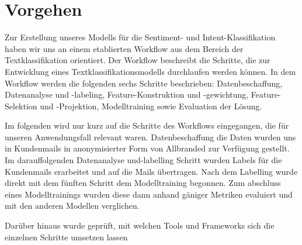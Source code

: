 \chapter{Vorgehen}

Zur Erstellung unseres Modells für die Sentiment- und Intent-Klassifikation haben wir uns an 
einem etablierten Workflow aus dem Bereich der Textklassifikation orientiert. Der Workflow 
beschreibt die Schritte, die zur Entwicklung eines Textklassifikationsmodells durchlaufen werden 
können. In dem Workflow werden die folgenden sechs Schritte beschrieben:  Datenbeschaffung, Datenanalyse 
und -labeling, Feature-Konstruktion und -gewichtung, Feature-Selektion und -Projektion,  Modelltraining 
sowie Evaluation der Lösung. \cite{Mirończuk}

Im folgenden wird nur kurz auf die Schritte des Workflows eingegangen, die für 
unseren Anwendungsfall relevant waren. Datenbeschaffung die Daten wurden uns in Kundenmails in anonymisierter 
Form von Allbranded zur Verfügung gestellt. Im darauffolgenden Datenanalyse und-labelling Schritt wurden Labels 
für die Kundenmails erarbeitet und auf die Mails übertragen. Nach dem Labelling wurde direkt mit dem fünften 
Schritt dem Modelltraining begonnen. Zum abschluss eines Modelltrainings wurden diese dann anhand gäniger
Metriken evaluiert und mit den anderen Modellen verglichen. \cite{Mirończuk}

Darüber hinaus wurde geprüft, mit welchen Tools und Frameworks sich die einzelnen Schritte umsetzen lassen


